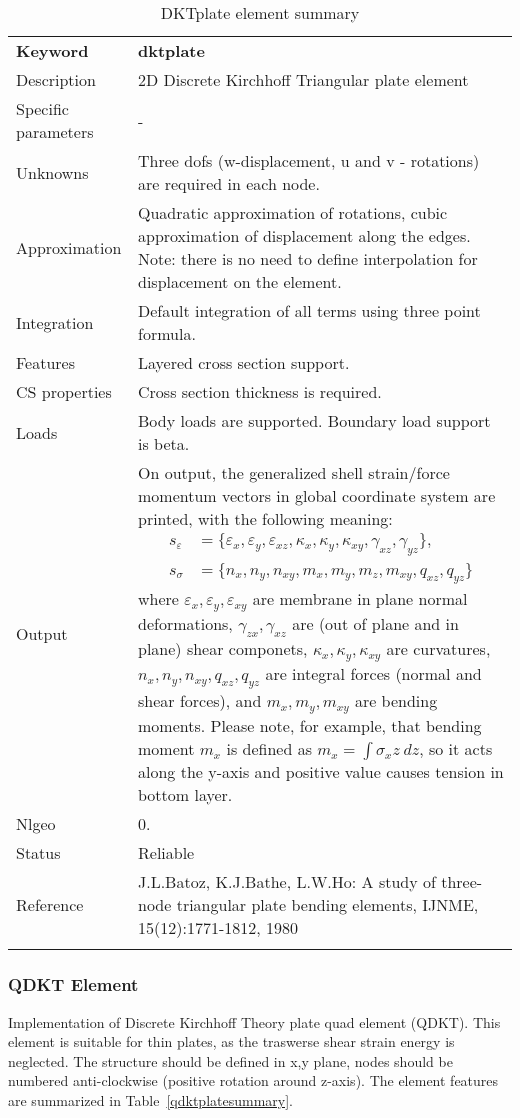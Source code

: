 \documentclass[a4paper]{article}
\newcommand{\param}[1]{\texttt{#1}} %
\newcommand{\templabel}{}%
\newcommand{\tempcaption}{}%
\newcounter{nelpar}
\newenvironment{elementsummary}[5]{%
  \gdef\tempcaption{#4}%
  \gdef\templabel{#5}%
  \setcounter{nelpar}{0}%
  \begin{center} %
    \begin{table}[!htb] %
      \begin{tabular}{|l|p{9cm}|}\hline %
        {\bf Keyword} & \bf{#1}\\ %
        {Description} & {#2}\\ %
        {Specific parameters} & {#3}\\ \hline %
}{
  \\ \hline %
      \end{tabular}%
      \caption{\tempcaption}%
      \label{\templabel}%
    \end{table}%
  \end{center}%
}
\newcommand{\elementParam}[1]{%
  \ifthenelse{\value{nelpar}>0} %
             {&{#1}}%
             {\setcounter{nelpar}{1}Parameters&{#1}}%
             \\%
}
\newcommand{\elementDescription}[2]{{#1} & {#2}\\ }
\begin{document}
\begin{elementsummary}{dktplate}{2D Discrete Kirchhoff Triangular plate element}{-}{DKTplate element summary}{dktplatesummary}
\elementDescription{Unknowns}{Three dofs (w-displacement, u and v - rotations) are required in each node.}
\elementDescription{Approximation}{Quadratic approximation of rotations, cubic approximation of displacement along the edges. Note: there is no need to define interpolation for displacement on the element.}
\elementDescription{Integration}{Default integration of all terms using three point formula.}
\elementDescription{Features}{Layered cross section support.}
\elementDescription{CS properties}{Cross section thickness is required.}
\elementDescription{Loads}{Body loads are supported. Boundary load support is beta.}
\elementDescription{Output}{On output, the generalized shell strain/force momentum vectors in global coordinate system are printed, with the following meaning:
\begin{align*}
s_{\varepsilon} &= \{\varepsilon_x, \varepsilon_y, \varepsilon_{xz}, \kappa_x, \kappa_y, \kappa_{xy}, \gamma_{xz}, \gamma_{yz}\},\\
s_{\sigma} &= \{n_x, n_y, n_{xy}, m_x, m_y, m_z, m_{xy}, q_{xz}, q_{yz}\}
\end{align*}
where $\varepsilon_x, \varepsilon_y, \varepsilon_{xy}$ are membrane in plane normal deformations, $\gamma_{zx}, \gamma_{xz}$ are (out of plane and in plane) shear componets, $\kappa_x, \kappa_y, \kappa_{xy}$ are curvatures, $n_x, n_y, n_{xy}, q_{xz}, q_{yz}$ are integral forces (normal and shear forces), and $m_x, m_y, m_{xy}$ are bending moments. 
Please note, for example, that bending moment $m_x$ is defined as $m_x=\int \sigma_x z\ dz$, so it acts along the y-axis and positive value causes tension in bottom layer.}
\elementDescription{Nlgeo}{0.}
\elementDescription{Status}{Reliable}
\elementDescription{Reference}{J.L.Batoz, K.J.Bathe, L.W.Ho: A study of three-node triangular plate bending elements, IJNME, 15(12):1771-1812, 1980}
\end{elementsummary}


\subsubsection {QDKT Element}
\label{qdkt}
Implementation of Discrete Kirchhoff Theory plate quad element (QDKT).
This element is suitable for thin plates, as the traswerse shear strain energy is neglected.
The structure should be defined in x,y plane, nodes should be numbered anti-clockwise (positive rotation around
z-axis). The element features are summarized in Table~\ref{qdktplatesummary}.
\end{document}
